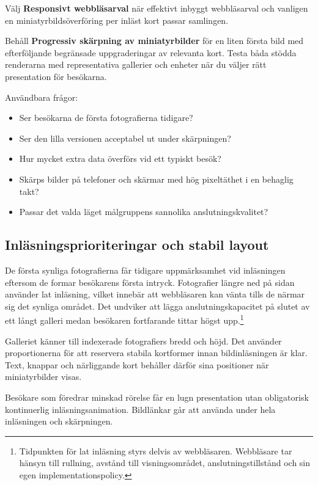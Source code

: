 \documentclass[11pt,a4paper]{article}
\newcommand{\ui}[1]{\textbf{#1}}
\begin{document}
Välj \ui{Responsivt webbläsarval} när effektivt inbyggt webbläsarval och
vanligen en miniatyrbildsöverföring per inläst kort passar samlingen.

Behåll \ui{Progressiv skärpning av miniatyrbilder} för en liten första bild med
efterföljande begränsade uppgraderingar av relevanta kort. Testa båda stödda
renderarna med representativa gallerier och enheter när du väljer rätt
presentation för besökarna.

Användbara frågor:

\begin{itemize}
  \item Ser besökarna de första fotografierna tidigare?
  \item Ser den lilla versionen acceptabel ut under skärpningen?
  \item Hur mycket extra data överförs vid ett typiskt besök?
  \item Skärps bilder på telefoner och skärmar med hög pixeltäthet i en behaglig
  takt?
  \item Passar det valda läget målgruppens sannolika anslutningskvalitet?
\end{itemize}

\subsection{Inläsningsprioriteringar och stabil layout}

De första synliga fotografierna får tidigare uppmärksamhet vid inläsningen
eftersom de formar besökarens första intryck. Fotografier längre ned på sidan
använder lat inläsning, vilket innebär att webbläsaren kan vänta tills de närmar
sig det synliga området. Det undviker att lägga anslutningskapacitet på slutet
av ett långt galleri medan besökaren fortfarande tittar högst
upp.\footnote{Tidpunkten för lat inläsning styrs delvis av webbläsaren.
Webbläsare tar hänsyn till rullning, avstånd till visningsområdet,
anslutningstillstånd och sin egen implementationspolicy.}

Galleriet känner till indexerade fotografiers bredd och höjd. Det använder
proportionerna för att reservera stabila kortformer innan bildinläsningen är
klar. Text, knappar och närliggande kort behåller därför sina positioner när
miniatyrbilder visas.

Besökare som föredrar minskad rörelse får en lugn presentation utan obligatorisk
kontinuerlig inläsningsanimation. Bildlänkar går att använda under hela
inläsningen och skärpningen.
\end{document}
